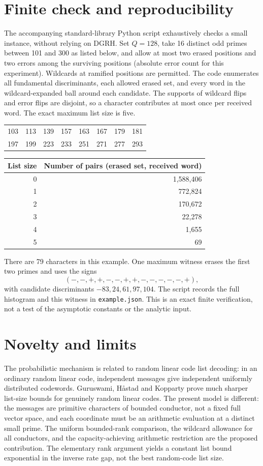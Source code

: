 \documentclass[11pt]{article}
\theoremstyle{remark}\newtheorem{remark}[theorem]{Remark}
\begin{document}
\section{Finite check and reproducibility}
The accompanying standard-library Python script exhaustively checks a small instance, without relying on DGRH. Set $Q=128$, take 16 distinct odd primes between 101 and 300 as listed below, and allow at most two erased positions and two errors among the surviving positions (absolute error count for this experiment). Wildcards at ramified positions are permitted. The code enumerates all fundamental discriminants, each allowed erased set, and every word in the wildcard-expanded ball around each candidate. The supports of wildcard flips and error flips are disjoint, so a character contributes at most once per received word. The exact maximum list size is five.
\begin{center}
\begin{tabular}{rrrrrrrr}
\toprule
103&113&139&157&163&167&179&181\\
197&199&223&233&251&271&277&293\\
\bottomrule
\end{tabular}
\end{center}
\begin{center}
\begin{tabular}{rr}
\toprule
List size & Number of pairs (erased set, received word)\\
\midrule
0 & 1,588,406\\
1 & 772,824\\
2 & 170,672\\
3 & 22,278\\
4 & 1,655\\
5 & 69\\
\bottomrule
\end{tabular}
\end{center}
There are 79 characters in this example. One maximum witness erases the first two primes and uses the signs
\[
 (-,-,+,+,-,-,+,+,-,-,-,-,-,+),
\]
with candidate discriminants $-83,24,61,97,104$. The script records the full histogram and this witness in \texttt{example.json}. This is an exact finite verification, not a test of the asymptotic constants or the analytic input.

\section{Novelty and limits}
The probabilistic mechanism is related to random linear code list decoding: in an ordinary random linear code, independent messages give independent uniformly distributed codewords. Guruswami, H\aa stad and Kopparty \cite{GHK} prove much sharper list-size bounds for genuinely random linear codes. The present model is different: the messages are primitive characters of bounded conductor, not a fixed full vector space, and each coordinate must be an arithmetic evaluation at a distinct small prime. The uniform bounded-rank comparison, the wildcard allowance for all conductors, and the capacity-achieving arithmetic restriction are the proposed contribution. The elementary rank argument yields a constant list bound exponential in the inverse rate gap, not the best random-code list size.
\end{document}
